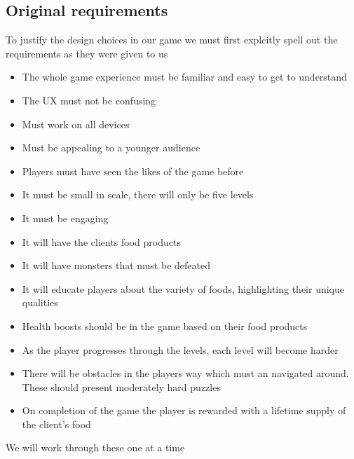 \documentclass{article}
\begin{document}
\subsection{Original requirements}
To justify the design choices in our game we must first explcitly spell out the requirements as they were given to us

\begin{itemize}
\item The whole game experience must be familiar and easy to get to understand
\item The UX must not be confusing
\item Must work on all devices
\item Must be appealing to a younger audience
\item Players must have seen the likes of the game before
\item It must be small in scale, there will only be five levels
\item It must be engaging
\item It will have the clients food products
\item It will have monsters that must be defeated
\item It will educate players about the variety of foods, highlighting their unique qualities
\item Health boosts should be in the game based on their food products
\item As the player progresses through the levels, each level will become harder
\item There will be obstacles in the players way which must an navigated around. These should present moderately hard puzzles
\item On completion of the game the player is rewarded with a lifetime supply of the client's food
\end{itemize}

We will work through these one at a time
\end{document}
